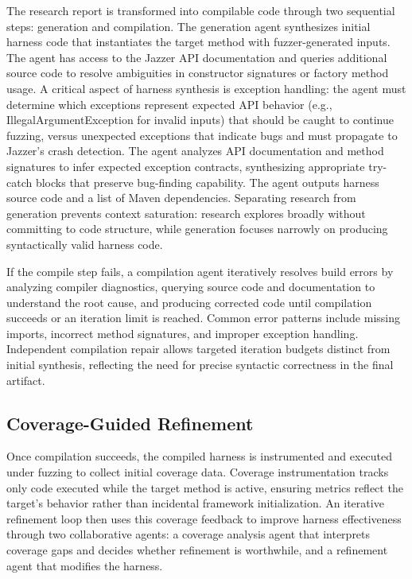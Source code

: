 The research report is transformed into compilable code through two sequential steps: generation and compilation. The generation agent synthesizes initial harness code that instantiates the target method with fuzzer-generated inputs. The agent has access to the Jazzer API documentation and queries additional source code to resolve ambiguities in constructor signatures or factory method usage. A critical aspect of harness synthesis is exception handling: the agent must determine which exceptions represent expected API behavior (e.g., IllegalArgumentException for invalid inputs) that should be caught to continue fuzzing, versus unexpected exceptions that indicate bugs and must propagate to Jazzer's crash detection. The agent analyzes API documentation and method signatures to infer expected exception contracts, synthesizing appropriate try-catch blocks that preserve bug-finding capability. The agent outputs harness source code and a list of Maven dependencies. Separating research from generation prevents context saturation: research explores broadly without committing to code structure, while generation focuses narrowly on producing syntactically valid harness code.

If the compile step fails, a compilation agent iteratively resolves build errors by analyzing compiler diagnostics, querying source code and documentation to understand the root cause, and producing corrected code until compilation succeeds or an iteration limit is reached. Common error patterns include missing imports, incorrect method signatures, and improper exception handling. Independent compilation repair allows targeted iteration budgets distinct from initial synthesis, reflecting the need for precise syntactic correctness in the final artifact.
\subsection{Coverage-Guided Refinement}%
\label{subsec:coverage-guided-refinement}

Once compilation succeeds, the compiled harness is instrumented and executed under fuzzing to collect initial coverage data. Coverage instrumentation tracks only code executed while the target method is active, ensuring metrics reflect the target's behavior rather than incidental framework initialization. An iterative refinement loop then uses this coverage feedback to improve harness effectiveness through two collaborative agents: a coverage analysis agent that interprets coverage gaps and decides whether refinement is worthwhile, and a refinement agent that modifies the harness.

